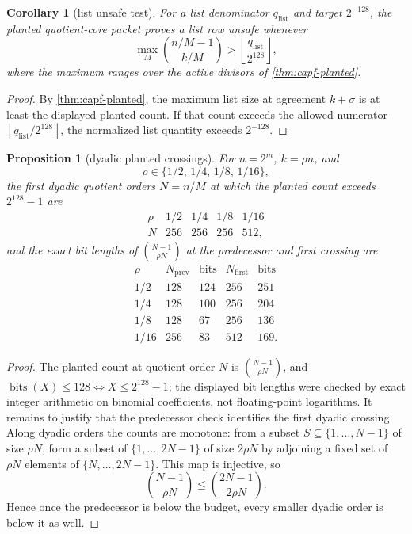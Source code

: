 \documentclass[11pt]{article}
\newtheorem{proposition}[proposition]{Proposition}
\newtheorem{corollary}[corollary]{Corollary}
\theoremstyle{definition}
\theoremstyle{remark}
\providecommand{\floor}[1]{\left\lfloor #1\right\rfloor}
\begin{document}
\begin{corollary}[list unsafe test]\label{cor:capf-list-unsafe}
For a list denominator $q_{\mathrm{list}}$ and target $2^{-128}$, the planted quotient-core packet proves a list row unsafe whenever
\[
\max_M\binom{n/M-1}{k/M}>
\floor{\frac{q_{\mathrm{list}}}{2^{128}}},
\]
where the maximum ranges over the active divisors of \cref{thm:capf-planted}.
\end{corollary}

\begin{proof}
By \cref{thm:capf-planted}, the maximum list size at agreement $k+\sigma$ is at least the displayed planted count.  If that count exceeds the allowed numerator $\floor{q_{\mathrm{list}}/2^{128}}$, the normalized list quantity exceeds $2^{-128}$.
\end{proof}

\begin{proposition}[dyadic planted crossings]\label{prop:capf-dyadic-planted}
For $n=2^m$, $k=\rho n$, and
\[
        \rho\in\{1/2,\,1/4,\,1/8,\,1/16\},
\]
the first dyadic quotient orders $N=n/M$ at which the planted count exceeds $2^{128}-1$ are
\[
\begin{array}{c|cccc}
\rho & 1/2 & 1/4 & 1/8 & 1/16\\ \hline
N & 256 & 256 & 256 & 512 ,
\end{array}
\]
and the exact bit lengths of $\binom{N-1}{\rho N}$ at the predecessor and first crossing are
\[
\begin{array}{c|cc|cc}
\rho & N_{\mathrm{prev}} & \operatorname{bits} & N_{\mathrm{first}} & \operatorname{bits}\\ \hline
1/2  & 128 & 124 & 256 & 251\\
1/4  & 128 & 100 & 256 & 204\\
1/8  & 128 &  67 & 256 & 136\\
1/16 & 256 &  83 & 512 & 169.
\end{array}
\]
\end{proposition}

\begin{proof}
The planted count at quotient order $N$ is $\binom{N-1}{\rho N}$, and $\operatorname{bits}(X)\le128\iff X\le2^{128}-1$; the displayed bit lengths were checked by exact integer arithmetic on binomial coefficients, not floating-point logarithms.  It remains to justify that the predecessor check identifies the first dyadic crossing.  Along dyadic orders the counts are monotone: from a subset $S\subseteq\{1,\ldots,N-1\}$ of size $\rho N$, form a subset of $\{1,\ldots,2N-1\}$ of size $2\rho N$ by adjoining a fixed set of $\rho N$ elements of $\{N,\ldots,2N-1\}$.  This map is injective, so
\[
        \binom{N-1}{\rho N}\le \binom{2N-1}{2\rho N}.
\]
Hence once the predecessor is below the budget, every smaller dyadic order is below it as well.
\end{proof}
\end{document}
